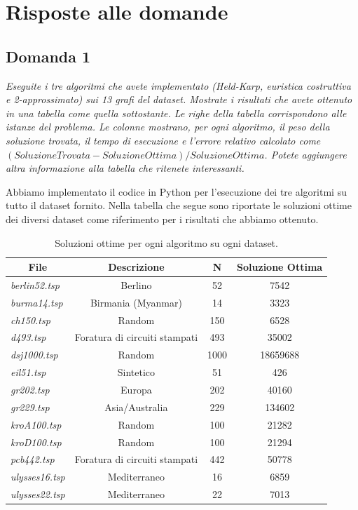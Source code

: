 \section{Risposte alle domande}

\subsection{Domanda 1}

\textit{Eseguite i tre algoritmi che avete implementato (Held-Karp, euristica costruttiva e 2-approssimato) sui 13 grafi
del dataset. Mostrate i risultati che avete ottenuto in una tabella come quella sottostante. Le righe della tabella
corrispondono alle istanze del problema. Le colonne mostrano, per ogni algoritmo, il peso della soluzione trovata, il
tempo di esecuzione e l'errore relativo calcolato come $(SoluzioneTrovata - SoluzioneOttima) / SoluzioneOttima$. Potete
aggiungere altra informazione alla tabella che ritenete interessanti.}

Abbiamo implementato il codice in Python per l'esecuzione dei tre algoritmi su tutto il dataset fornito. Nella tabella che segue sono riportate le soluzioni ottime dei diversi dataset come riferimento per i risultati che abbiamo ottenuto.

\begin{table}[H]
  \centering
  \begin{tabular}{|l|c|c|c|}
  \hline
  \multicolumn{1}{|c|}{\textbf{File}} & \textbf{Descrizione} & \textbf{N} & \textbf{Soluzione Ottima} \\ \hline
  \textit{berlin52.tsp} & Berlino & 52 & 7542 \\ 
  \textit{burma14.tsp} & Birmania (Myanmar) & 14 & 3323 \\ 
  \textit{ch150.tsp} & Random & 150 & 6528 \\ 
  \textit{d493.tsp} & Foratura di circuiti stampati & 493 & 35002 \\ 
  \textit{dsj1000.tsp} & Random & 1000 & 18659688 \\ 
  \textit{eil51.tsp} & Sintetico & 51 & 426 \\ 
  \textit{gr202.tsp} & Europa & 202 & 40160 \\ 
  \textit{gr229.tsp} & Asia/Australia & 229 & 134602 \\ 
  \textit{kroA100.tsp} & Random & 100 & 21282 \\ 
  \textit{kroD100.tsp} & Random & 100 & 21294 \\ 
  \textit{pcb442.tsp} & Foratura di circuiti stampati & 442 & 50778 \\ 
  \textit{ulysses16.tsp} & Mediterraneo & 16 & 6859 \\ 
  \textit{ulysses22.tsp} & Mediterraneo & 22 & 7013 \\ \hline
  \end{tabular}
  \caption{Soluzioni ottime per ogni algoritmo su ogni dataset.}
  \label{tab:opt-results}
  \end{table}

